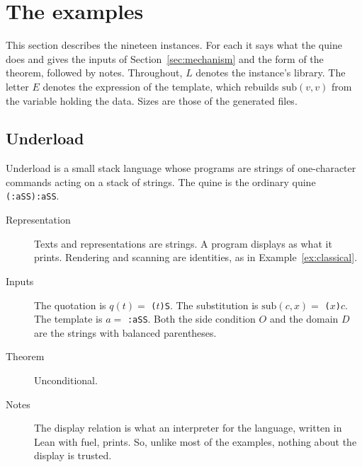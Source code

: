 \documentclass[11pt]{amsart}
\theoremstyle{definition}
\theoremstyle{remark}
\newcommand{\sub}{\mathrm{sub}}
\begin{document}
\fussy
\section{The examples}\label{sec:examples}

This section describes the nineteen instances. For each it says what the quine does and gives the
inputs of
Section~\ref{sec:mechanism} and the form of the theorem, followed by notes. Throughout, $L$ denotes
the instance's library. The letter $E$ denotes the expression of the template, which rebuilds
$\sub(v,v)$ from the variable holding the data. Sizes are those of the generated files.

\subsection{Underload}
Underload is a small stack language whose programs are strings of one-character commands acting on
a stack of strings. The quine is the ordinary quine \verb|(:aSS):aSS|.
\begin{description}
\item[Representation] Texts and representations are strings. A program displays as what it
prints. Rendering and scanning are identities, as in Example~\ref{ex:classical}.
\item[Inputs] The quotation is $q(t) = $ \verb|(|$t$\verb|)S|. The substitution is $\sub(c,x)
= $ \verb|(|$x$\verb|)|$c$. The template is $a = $ \verb|:aSS|. Both the side condition $O$
and the domain $D$ are the strings with balanced parentheses.
\item[Theorem] Unconditional.
\item[Notes] The display relation is what an interpreter for the language, written in Lean with
fuel, prints. So, unlike most of the examples, nothing about the display is trusted.
\end{description}
\end{document}
